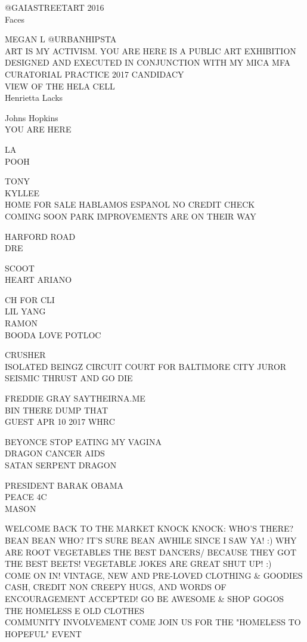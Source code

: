 \documentclass[10pt,letterpaper]{article}
\begin{document}
@GAIASTREETART 2016\\
Faces

MEGAN L @URBANHIPSTA\\
ART IS MY ACTIVISM.  YOU ARE HERE IS A PUBLIC ART EXHIBITION DESIGNED AND EXECUTED IN CONJUNCTION WITH MY MICA MFA CURATORIAL PRACTICE 2017 CANDIDACY\\
VIEW OF THE HELA CELL\\
Henrietta Lacks

Johns Hopkins\\
YOU ARE HERE

LA\\
POOH

TONY\\
KYLLEE\\
HOME FOR SALE HABLAMOS ESPANOL NO CREDIT CHECK\\
COMING SOON PARK IMPROVEMENTS ARE ON THEIR WAY

HARFORD ROAD\\
DRE

SCOOT\\
HEART ARIANO

CH FOR CLI\\
LIL YANG\\
RAMON\\
BOODA LOVE POTLOC

CRUSHER\\
ISOLATED BEINGZ CIRCUIT COURT FOR BALTIMORE CITY JUROR\\
SEISMIC THRUST AND GO DIE

FREDDIE GRAY SAYTHEIRNA.ME\\
BIN THERE DUMP THAT\\
GUEST APR 10 2017 WHRC

BEYONCE STOP EATING MY VAGINA\\
DRAGON CANCER AIDS\\
SATAN SERPENT DRAGON

PRESIDENT BARAK OBAMA\\
PEACE 4C\\
MASON

WELCOME BACK TO THE MARKET KNOCK KNOCK: WHO'S THERE? BEAN BEAN WHO?  IT'S SURE BEAN AWHILE SINCE I SAW YA!  :) WHY ARE ROOT VEGETABLES THE BEST DANCERS/  BECAUSE THEY GOT THE BEST BEETS!  VEGETABLE JOKES ARE GREAT SHUT UP! :)\\
COME ON IN!  VINTAGE, NEW AND PRE{-}LOVED CLOTHING \& GOODIES CASH, CREDIT NON CREEPY HUGS, AND WORDS OF ENCOURAGEMENT ACCEPTED!  GO BE AWESOME \& SHOP GOGOS\\
THE HOMELESS E OLD CLOTHES\\
COMMUNITY INVOLVEMENT COME JOIN US FOR THE "HOMELESS TO HOPEFUL" EVENT
\end{document}
